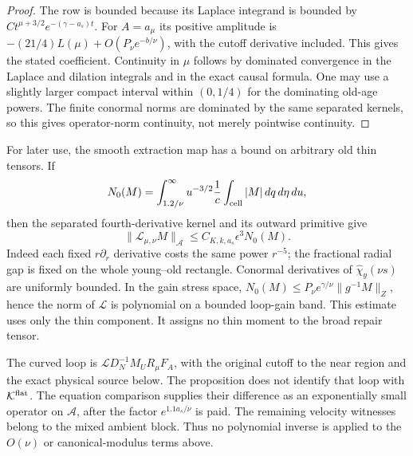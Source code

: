 \begin{proof}
The row is bounded because its Laplace integrand is bounded by
$C t^{\mu+3/2}e^{-(\gamma-a_s)t}$.
For $A=a_\mu$ its positive amplitude is
$-(21/4)L(\mu)+O(P_\nu e^{-b/\nu})$, with the cutoff derivative
included. This gives the stated coefficient. Continuity in $\mu$
follows by dominated convergence in the Laplace and dilation integrals
and in the exact causal formula. One may use a slightly larger compact
interval within $(0,1/4)$ for the dominating old-age powers.
The finite conormal norms are dominated by the same separated kernels,
so this gives operator-norm continuity, not merely pointwise continuity.
\end{proof}

For later use, the smooth extraction map has a bound on arbitrary
old thin tensors. If
\[
 N_0(M)=\int_{1.2/\nu}^\infty u^{-3/2}
                \frac1c\int_{\rm cell}|M|\,dq\,d\eta\,du,
\]
then the separated fourth-derivative kernel and its outward primitive give
\begin{equation}\label{source-class:ambient-L}
 \|\mathcal L_{\mu,\nu}M\|_{\mathscr A}
       \le C_{K,k,a_s}\epsilon^3N_0(M).
\end{equation}
Indeed each fixed $r\partial_r$ derivative costs the same power $r^{-5}$;
the fractional radial gap is fixed on the whole young--old rectangle.
Conormal derivatives of $\widehat\chi_y(\nu s)$ are uniformly bounded.
In the gain stress space, $N_0(M)\le P_\nu e^{\gamma/\nu}
\|g^{-1}M\|_Z$, hence the norm of $\mathcal L$ is polynomial on a
bounded loop-gain band. This estimate uses only the thin component.
It assigns no thin moment to the broad repair tensor.

The curved loop is $\mathcal L D_N^{-1}M_UR_\mu F_A$, with the
original cutoff to the near region and the exact physical source below. The proposition
does not identify that loop with $\mathcal K^{\rm flat}$. The equation
comparison supplies their difference as an exponentially small operator
on $\mathscr A$, after the factor $e^{1.1a_s/\nu}$ is paid. The remaining
velocity witnesses belong to the mixed ambient block. Thus no polynomial
inverse is applied to the $O(\nu)$ or canonical-modulus terms above.
